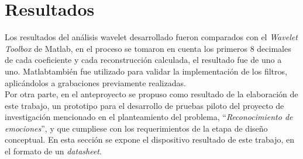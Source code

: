 \documentclass[11pt,lettersize]{article} %
\begin{document}
\cleardoublepage
\section{Resultados}
\label{S-resultado}
Los resultados del análisis wavelet desarrollado fueron comparados con el \textit{Wavelet Toolbox} de Matlab\textregistered, en el proceso se tomaron en cuenta los primeros 8 decimales de cada coeficiente y cada reconstrucción calculada, el resultado fue de uno a uno. Matlab\textregistered también fue utilizado para validar la implementación de los filtros, aplicándolos a grabaciones previamente realizadas.\\

Por otra parte, en el anteproyecto se propuso como resultado de la elaboración de este trabajo, un prototipo para el desarrollo de pruebas piloto del proyecto de investigación mencionado en el planteamiento del problema, ``\emph{Reconocimiento de emociones}'', y que cumpliese con los requerimientos de la etapa de diseño conceptual. En esta sección se expone el dispositivo resultado de este trabajo, en el formato de un \textit{datasheet}.

\label{S-datasheet}
\end{document}
